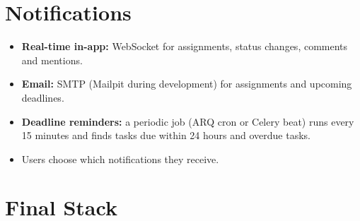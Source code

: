 \documentclass[11pt,a4paper]{article}
\begin{document}
\section{Notifications}

\begin{itemize}
  \item \textbf{Real-time in-app:} WebSocket for assignments, status changes, comments and mentions.
  \item \textbf{Email:} SMTP (Mailpit during development) for assignments and upcoming deadlines.
  \item \textbf{Deadline reminders:} a periodic job (ARQ cron or Celery beat) runs every 15 minutes and finds tasks due within 24 hours and overdue tasks.
  \item Users choose which notifications they receive.
\end{itemize}

\section{Final Stack}
\end{document}
